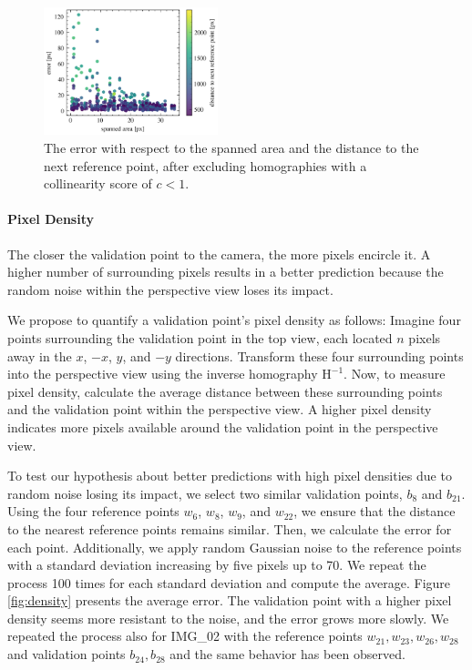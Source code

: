 \begin{figure}
	\begin{center}
		\includegraphics[width=0.45\textwidth]{figures/scatter_error_by_area_distance.png}
	\end{center}
	\caption{The error with respect to the spanned area and the distance
	to the next reference point, after excluding homographies with 
	a collinearity score of $c < 1$.}
	\label{fig:error_by_area_and_distance}
\end{figure}

\paragraph{Pixel Density}
The closer the validation point to the camera, the more pixels encircle it. 
A higher number of surrounding pixels results in a better prediction because 
the random noise within the perspective view loses its impact.

We propose to quantify a validation point's pixel density as follows: 
Imagine four points surrounding the validation point in the top view, each 
located $n$ pixels away in the $x$, $-x$, $y$, and $-y$ directions. 
Transform these four surrounding points into the perspective view using the 
inverse homography $\mathrm{H}^{-1}$. Now, to measure pixel density, 
calculate the average distance between these surrounding points and the 
validation point within the perspective view. A higher pixel density 
indicates more pixels available around the validation point in the 
perspective view.

To test our hypothesis about better predictions with high pixel densities 
due to random noise losing its impact, we select two similar validation 
points, $b_{8}$ and $b_{21}$. Using the four reference points $w_6$, $w_8$, $w_9$, 
and $w_{22}$, we ensure that the distance to the nearest reference 
points remains similar. 
Then, we calculate the error for each point. Additionally, we apply 
random Gaussian noise to the reference points with a standard deviation 
increasing by five pixels up to 70. We repeat the process 100 times for each 
standard deviation and compute the average. Figure \ref{fig:density} 
presents the average error. The validation point with a higher pixel density seems more 
resistant to the noise, and the error grows more slowly. We repeated the 
process also for IMG\_02 with the reference points 
$w_{21}, w_{23}, w_{26}, w_{28}$ and validation points $b_{24}, b_{28}$ and 
the same behavior has been observed. 

